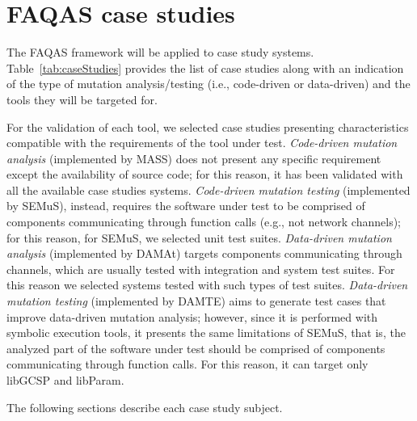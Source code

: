 
\chapter{FAQAS case studies}
\label{chapter:caseStudies}

The FAQAS framework will be applied to  case study systems. Table~\ref{tab:caseStudies} provides the list of case studies along with an indication of the type of mutation analysis/testing (i.e., code-driven or data-driven) and the tools they will be targeted for. 

\STARTCHANGEDWPT
For the validation of each tool, we selected case studies presenting characteristics compatible with the requirements of the tool under test. \emph{Code-driven mutation analysis} (implemented by MASS) does not present any specific requirement except the availability of source code; for this reason, it has been validated with all the available case studies systems.
\emph{Code-driven mutation testing} (implemented by SEMuS), instead, requires the software under test to be comprised of components communicating through function calls (e.g., not network channels); for this reason, for SEMuS, we selected unit test suites.
\emph{Data-driven mutation analysis} (implemented by DAMAt) targets components communicating through channels, which are usually tested with integration and system test suites. For this reason we selected systems tested with such types of test suites.
\emph{Data-driven mutation testing} (implemented by DAMTE) aims to generate test cases that improve data-driven mutation analysis; however, since it is performed with symbolic execution tools, it presents the same limitations of SEMuS, that is, the analyzed part of the software under test should be comprised of components communicating through function calls. For this reason, it can target only libGCSP and libParam.

The following sections describe each case study subject.

